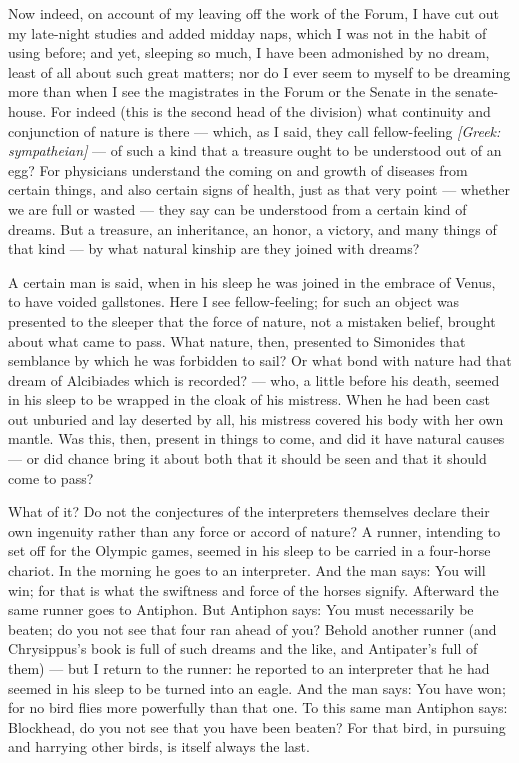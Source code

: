  Now indeed, on account of my leaving off the work of the Forum, I have cut out my late-night studies and added midday naps, which I was not in the habit of using before; and yet, sleeping so much, I have been admonished by no dream, least of all about such great matters; nor do I ever seem to myself to be dreaming more than when I see the magistrates in the Forum or the Senate in the senate-house. For indeed (this is the second head of the division) what continuity and conjunction of nature is there — which, as I said, they call fellow-feeling \textit{[Greek: sympatheian]} — of such a kind that a treasure ought to be understood out of an egg? For physicians understand the coming on and growth of diseases from certain things, and also certain signs of health, just as that very point — whether we are full or wasted — they say can be understood from a certain kind of dreams. But a treasure, an inheritance, an honor, a victory, and many things of that kind — by what natural kinship are they joined with dreams?

 A certain man is said, when in his sleep he was joined in the embrace of Venus, to have voided gallstones. Here I see fellow-feeling; for such an object was presented to the sleeper that the force of nature, not a mistaken belief, brought about what came to pass. What nature, then, presented to Simonides that semblance by which he was forbidden to sail? Or what bond with nature had that dream of Alcibiades which is recorded? — who, a little before his death, seemed in his sleep to be wrapped in the cloak of his mistress. When he had been cast out unburied and lay deserted by all, his mistress covered his body with her own mantle. Was this, then, present in things to come, and did it have natural causes — or did chance bring it about both that it should be seen and that it should come to pass?

 What of it? Do not the conjectures of the interpreters themselves declare their own ingenuity rather than any force or accord of nature? A runner, intending to set off for the Olympic games, seemed in his sleep to be carried in a four-horse chariot. In the morning he goes to an interpreter. And the man says: You will win; for that is what the swiftness and force of the horses signify. Afterward the same runner goes to Antiphon. But Antiphon says: You must necessarily be beaten; do you not see that four ran ahead of you? Behold another runner (and Chrysippus's book is full of such dreams and the like, and Antipater's full of them) — but I return to the runner: he reported to an interpreter that he had seemed in his sleep to be turned into an eagle. And the man says: You have won; for no bird flies more powerfully than that one. To this same man Antiphon says: Blockhead, do you not see that you have been beaten? For that bird, in pursuing and harrying other birds, is itself always the last.

